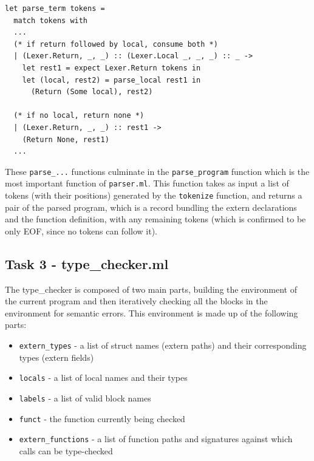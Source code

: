 \documentclass[11pt, a4paper]{article}
\begin{document}
\begin{lstlisting}[language={[Objective]Caml}]
let parse_term tokens = 
  match tokens with
  ...
  (* if return followed by local, consume both *)
  | (Lexer.Return, _, _) :: (Lexer.Local _, _, _) :: _ ->
    let rest1 = expect Lexer.Return tokens in 
    let (local, rest2) = parse_local rest1 in
      (Return (Some local), rest2)

  (* if no local, return none *)
  | (Lexer.Return, _, _) :: rest1 ->
    (Return None, rest1)
  ...
\end{lstlisting}

\medskip

These \texttt{parse\_...} functions culminate in the \texttt{parse\_program} function which is the most important function of \texttt{parser.ml}. This function
takes as input a list of tokens (with their positions) generated by the \texttt{tokenize} function, and returns a pair of the parsed program, which is a record bundling the extern declarations 
and the function definition, with any remaining tokens (which is confirmed to be only EOF, since no tokens can follow it).

\medskip

\subsection{Task 3 - type\_checker.ml}
The type\_checker is composed of two main parts, building the environment of the current program and then iteratively checking all the blocks in the environment for semantic errors. 
This environment is made up of the following parts:

\medskip

\begin{itemize}[nosep]
    \item \texttt{extern\_types} - a list of struct names (extern paths) and their corresponding types (extern fields)
    \item \texttt{locals}        - a list of local names and their types
    \item \texttt{labels}        - a list of valid block names
    \item \texttt{funct}         - the function currently being checked
    \item \texttt{extern\_functions} - a list of function paths and signatures against which calls can be type-checked
\end{itemize}

\medskip
\end{document}
